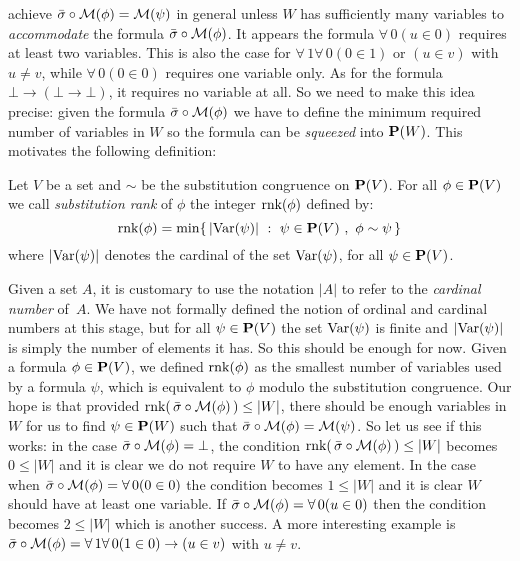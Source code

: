 achieve $\bar{\sigma}\circ{\cal M}(\phi)={\cal M}(\psi)$ in general
unless $W$ has sufficiently many variables to {\em accommodate} the
formula $\bar{\sigma}\circ{\cal M}(\phi)$. It appears the formula
$\forall\,0(u\in 0)$ requires at least two variables. This is also
the case for $\forall\,1\forall\,0(0\in 1)$ or $(u\in v)$ with
$u\neq v$, while $\forall\,0(0\in 0)$ requires one variable only. As
for the formula $\bot\to(\bot\to\bot)$, it requires no variable at
all. So we need to make this idea precise: given the formula
$\bar{\sigma}\circ{\cal M}(\phi)$ we have to define the minimum
required number of variables in $W$ so the formula can be {\em
squeezed} into ${\bf P}(W)$. This motivates the following
definition:
\begin{defin}\label{logic:def:FOPL:substrank:substrank}
Let $V$ be a set and $\sim$ be the substitution congruence on $\mbox{${\bf P}(V)$}$.
For all $\phi\in\mbox{${\bf P}(V)$}$ we call {\em substitution rank} of $\phi$ the
integer $\mbox{\rm rnk}(\phi)$ defined by:
    \[
    \mbox{\rm rnk}(\phi)=\min\{\,|\mbox{\rm Var}(\psi)|\ :\
    \psi\in\mbox{${\bf P}(V)$}\ ,\ \phi\sim\psi\,\}
    \]
where $|\mbox{\rm Var}(\psi)|$ denotes the cardinal of the set $\mbox{\rm Var}(\psi)$,
for all $\psi\in\mbox{${\bf P}(V)$}$.
\end{defin}
Given a set $A$, it is customary to use the notation $|A|$ to refer
to the {\em cardinal number} of~$A$. We have not formally defined
the notion of ordinal and cardinal numbers at this stage, but for
all $\psi\in\mbox{${\bf P}(V)$}$ the set $\mbox{\rm Var}(\psi)$ is finite and $|\mbox{\rm Var}(\psi)|$
is simply the number of elements it has. So this should be enough
for now. Given a formula $\phi\in\mbox{${\bf P}(V)$}$, we defined $\mbox{\rm rnk}(\phi)$ as
the smallest number of variables used by a formula $\psi$, which is
equivalent to $\phi$ modulo the substitution congruence. Our hope is
that provided $\mbox{\rm rnk}(\,\bar{\sigma}\circ{\cal M}(\phi)\,)\leq|W|$,
there should be enough variables in $W$ for us to find $\psi\in{\bf
P}(W)$ such that $\bar{\sigma}\circ{\cal M}(\phi)={\cal M}(\psi)$.
So let us see if this works: in the case $\bar{\sigma}\circ{\cal
M}(\phi)=\bot$, the condition $\mbox{\rm rnk}(\,\bar{\sigma}\circ{\cal
M}(\phi)\,)\leq|W|$ becomes $0\leq|W|$ and it is clear we do not
require $W$ to have any element. In the case when
$\bar{\sigma}\circ{\cal M}(\phi)=\forall\,0(0\in 0)$ the condition
becomes $1\leq |W|$ and it is clear $W$ should have at least one
variable. If $\bar{\sigma}\circ{\cal M}(\phi)=\forall\,0(u\in 0)$
then the condition becomes $2\leq |W|$ which is another success. A
more interesting example is $\bar{\sigma}\circ{\cal
M}(\phi)=\forall\,1\forall\,0(1\in 0)\to(u\in v)$ with $u\neq v$.
